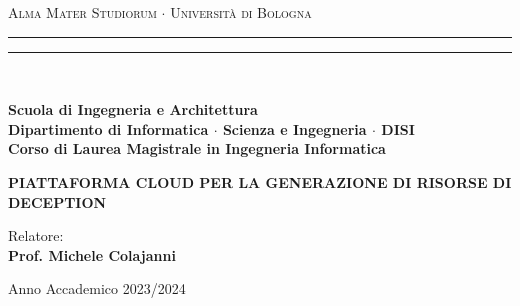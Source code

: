 
\begin{titlepage}
    \begin{center}
      {{\Large{\textsc{Alma Mater Studiorum $\cdot$ Universit\`a di Bologna}}}}
      \rule[0.1cm]{15.8cm}{0.1mm}
      \rule[0.5cm]{15.8cm}{0.6mm}
      \\\vspace{3mm}
  
      {\small{\bf Scuola di Ingegneria e Architettura \\
              Dipartimento di Informatica $\cdot$ Scienza e Ingegneria $\cdot$ DISI\\
              Corso di Laurea Magistrale in Ingegneria Informatica}}
  
  
  \end{center}
  
  \vspace{23mm}
  
  \begin{center}{
          \large \bf PIATTAFORMA CLOUD PER LA GENERAZIONE DI RISORSE DI DECEPTION\par
      }\end{center}
  
  \vspace{40mm} \par \noindent
  
  \begin{minipage}[t]{0.47\textwidth}{
      \large{
      Relatore:
      \vspace{2mm}\\{
      \bf Prof. Michele Colajanni
      }
      }
      }
  \end{minipage}
  \hfill
  \begin{minipage}[t]{0.47\textwidth}
  \end{minipage}
  
  \vspace{40mm}
  
  \begin{center}
      Anno Accademico 2023/2024
  \end{center}
  \end{titlepage}